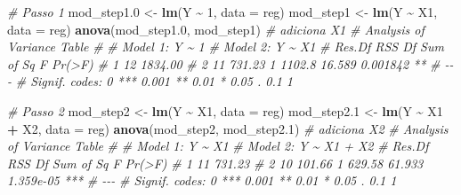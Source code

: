 \documentclass[
]{book}
\newenvironment{Shaded}{\begin{snugshade}}{\end{snugshade}}
\newcommand{\CommentTok}[1]{\textcolor[rgb]{0.56,0.35,0.01}{\textit{#1}}}
\newcommand{\DataTypeTok}[1]{\textcolor[rgb]{0.13,0.29,0.53}{#1}}
\newcommand{\DecValTok}[1]{\textcolor[rgb]{0.00,0.00,0.81}{#1}}
\newcommand{\FloatTok}[1]{\textcolor[rgb]{0.00,0.00,0.81}{#1}}
\newcommand{\KeywordTok}[1]{\textcolor[rgb]{0.13,0.29,0.53}{\textbf{#1}}}
\newcommand{\NormalTok}[1]{#1}
\newcommand{\OperatorTok}[1]{\textcolor[rgb]{0.81,0.36,0.00}{\textbf{#1}}}
\newcommand{\StringTok}[1]{\textcolor[rgb]{0.31,0.60,0.02}{#1}}
\numberwithin{equation}{section}
\begin{document}
\begin{Shaded}
\begin{Highlighting}[]
\CommentTok{\# Passo 1}
\NormalTok{mod\_step1}\FloatTok{.0}\NormalTok{ \textless{}{-}}\StringTok{ }\KeywordTok{lm}\NormalTok{(Y }\OperatorTok{\textasciitilde{}}\StringTok{ }\DecValTok{1}\NormalTok{, }\DataTypeTok{data =}\NormalTok{ reg)}
\NormalTok{mod\_step1 \textless{}{-}}\StringTok{ }\KeywordTok{lm}\NormalTok{(Y }\OperatorTok{\textasciitilde{}}\StringTok{ }\NormalTok{X1, }\DataTypeTok{data =}\NormalTok{ reg)}
\KeywordTok{anova}\NormalTok{(mod\_step1}\FloatTok{.0}\NormalTok{, mod\_step1) }\CommentTok{\# adiciona X1}
\CommentTok{\# Analysis of Variance Table}
\CommentTok{\# }
\CommentTok{\# Model 1: Y \textasciitilde{} 1}
\CommentTok{\# Model 2: Y \textasciitilde{} X1}
\CommentTok{\#   Res.Df     RSS Df Sum of Sq      F   Pr(\textgreater{}F)   }
\CommentTok{\# 1     12 1834.00                                }
\CommentTok{\# 2     11  731.23  1    1102.8 16.589 0.001842 **}
\CommentTok{\# {-}{-}{-}}
\CommentTok{\# Signif. codes:  0 \textquotesingle{}***\textquotesingle{} 0.001 \textquotesingle{}**\textquotesingle{} 0.01 \textquotesingle{}*\textquotesingle{} 0.05 \textquotesingle{}.\textquotesingle{} 0.1 \textquotesingle{} \textquotesingle{} 1}

\CommentTok{\# Passo 2}
\NormalTok{mod\_step2 \textless{}{-}}\StringTok{ }\KeywordTok{lm}\NormalTok{(Y }\OperatorTok{\textasciitilde{}}\StringTok{ }\NormalTok{X1, }\DataTypeTok{data =}\NormalTok{ reg)}
\NormalTok{mod\_step2}\FloatTok{.1}\NormalTok{ \textless{}{-}}\StringTok{ }\KeywordTok{lm}\NormalTok{(Y }\OperatorTok{\textasciitilde{}}\StringTok{ }\NormalTok{X1 }\OperatorTok{+}\StringTok{ }\NormalTok{X2, }\DataTypeTok{data =}\NormalTok{ reg)}
\KeywordTok{anova}\NormalTok{(mod\_step2, mod\_step2}\FloatTok{.1}\NormalTok{) }\CommentTok{\# adiciona X2}
\CommentTok{\# Analysis of Variance Table}
\CommentTok{\# }
\CommentTok{\# Model 1: Y \textasciitilde{} X1}
\CommentTok{\# Model 2: Y \textasciitilde{} X1 + X2}
\CommentTok{\#   Res.Df    RSS Df Sum of Sq      F    Pr(\textgreater{}F)    }
\CommentTok{\# 1     11 731.23                                  }
\CommentTok{\# 2     10 101.66  1    629.58 61.933 1.359e{-}05 ***}
\CommentTok{\# {-}{-}{-}}
\CommentTok{\# Signif. codes:  0 \textquotesingle{}***\textquotesingle{} 0.001 \textquotesingle{}**\textquotesingle{} 0.01 \textquotesingle{}*\textquotesingle{} 0.05 \textquotesingle{}.\textquotesingle{} 0.1 \textquotesingle{} \textquotesingle{} 1}


\end{Highlighting}
\end{Shaded}
\end{document}
